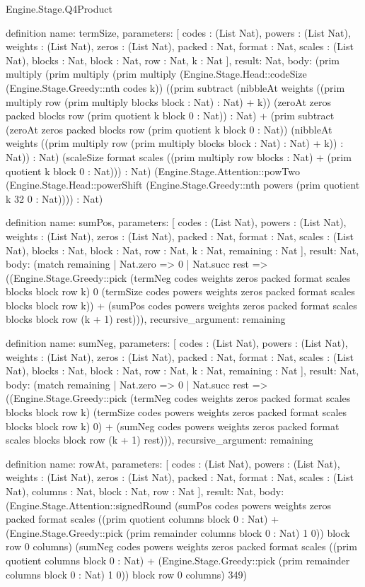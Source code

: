 \begin{lexlean}{Engine.Stage.Q4Product}
\begin{semanticmodule}
definition{
  name: termSize,
  parameters: [
    codes : (List Nat),
    powers : (List Nat),
    weights : (List Nat),
    zeros : (List Nat),
    packed : Nat,
    format : Nat,
    scales : (List Nat),
    blocks : Nat,
    block : Nat,
    row : Nat,
    k : Nat
  ],
  result: Nat,
  body: (prim multiply (prim multiply (prim multiply (Engine.Stage.Head::codeSize (Engine.Stage.Greedy::nth codes k)) ((prim subtract (nibbleAt weights ((prim multiply row (prim multiply blocks block : Nat) : Nat) + k)) (zeroAt zeros packed blocks row (prim quotient k block 0 : Nat)) : Nat) + (prim subtract (zeroAt zeros packed blocks row (prim quotient k block 0 : Nat)) (nibbleAt weights ((prim multiply row (prim multiply blocks block : Nat) : Nat) + k)) : Nat)) : Nat) (scaleSize format scales ((prim multiply row blocks : Nat) + (prim quotient k block 0 : Nat))) : Nat) (Engine.Stage.Attention::powTwo (Engine.Stage.Head::powerShift (Engine.Stage.Greedy::nth powers (prim quotient k 32 0 : Nat)))) : Nat)
}

definition{
  name: sumPos,
  parameters: [
    codes : (List Nat),
    powers : (List Nat),
    weights : (List Nat),
    zeros : (List Nat),
    packed : Nat,
    format : Nat,
    scales : (List Nat),
    blocks : Nat,
    block : Nat,
    row : Nat,
    k : Nat,
    remaining : Nat
  ],
  result: Nat,
  body: (match remaining
    | Nat.zero => 0
    | Nat.succ rest => ((Engine.Stage.Greedy::pick (termNeg codes weights zeros packed format scales blocks block row k) 0 (termSize codes powers weights zeros packed format scales blocks block row k)) + (sumPos codes powers weights zeros packed format scales blocks block row (k + 1) rest))),
  recursive_argument: remaining
}

definition{
  name: sumNeg,
  parameters: [
    codes : (List Nat),
    powers : (List Nat),
    weights : (List Nat),
    zeros : (List Nat),
    packed : Nat,
    format : Nat,
    scales : (List Nat),
    blocks : Nat,
    block : Nat,
    row : Nat,
    k : Nat,
    remaining : Nat
  ],
  result: Nat,
  body: (match remaining
    | Nat.zero => 0
    | Nat.succ rest => ((Engine.Stage.Greedy::pick (termNeg codes weights zeros packed format scales blocks block row k) (termSize codes powers weights zeros packed format scales blocks block row k) 0) + (sumNeg codes powers weights zeros packed format scales blocks block row (k + 1) rest))),
  recursive_argument: remaining
}

definition{
  name: rowAt,
  parameters: [
    codes : (List Nat),
    powers : (List Nat),
    weights : (List Nat),
    zeros : (List Nat),
    packed : Nat,
    format : Nat,
    scales : (List Nat),
    columns : Nat,
    block : Nat,
    row : Nat
  ],
  result: Nat,
  body: (Engine.Stage.Attention::signedRound (sumPos codes powers weights zeros packed format scales ((prim quotient columns block 0 : Nat) + (Engine.Stage.Greedy::pick (prim remainder columns block 0 : Nat) 1 0)) block row 0 columns) (sumNeg codes powers weights zeros packed format scales ((prim quotient columns block 0 : Nat) + (Engine.Stage.Greedy::pick (prim remainder columns block 0 : Nat) 1 0)) block row 0 columns) 349)
}


\end{semanticmodule}
\end{lexlean}

